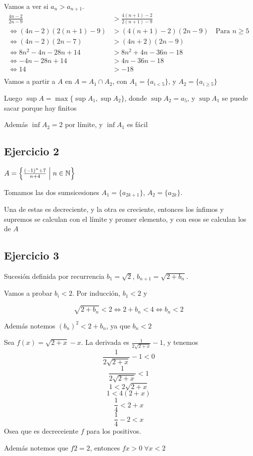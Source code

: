 \documentclass{article}
\begin{document}
	Vamos a ver si $a_n > a_{n+1}$.
\begin{align*}
	\frac{4n-2}{2n-9} &> \frac{4(n+1)-2}{2(n+1)-9} \\
	\iff (4n-2)(2(n+1)-9) &> (4(n+1)-2)(2n-9) \quad \text{Para $n \geq 5$}\\
	\iff (4n-2)(2n-7) &> (4n+2)(2n-9) \\
	\iff 8n^2-4n-28n+14 &> 8n^2+4n-36n-18 \\
	\iff -4n-28n+14 &> 4n-36n-18 \\
	\iff 14 &> -18 \\
\end{align*}
Vamos a partir a $A$ en $A = A_1 \cap A_2$, con $A_1 = \{a_{i < 5}\}$, y $A_2 = \{a_{i\geq 5}\}$

Luego $\sup A = \max \{\sup A_1, \sup A_2\}$, donde $\sup A_2 = a_5$, y $\sup A_1$ se
puede sacar porque hay finitos

Además $\inf A_2 = 2$ por límite, y $\inf A_1$ es fácil

\subsection{Ejercicio 2}
$A = \left\{\frac{(-1)^n + 7}{n+4} \; \middle| \; n \in \mathbb{N}\right\}$

Tomamos las dos sumsicesiones $A_1 = \{a_{2k+1}\}$, $A_2 = \{a_{2k}\}$.

Una de estas es decreciente, y la otra es creciente, entonces los ínfimos y supremos se
calculan con el límite y promer elemento, y con esos se calculan los de $A$

\subsection{Ejercicio 3}
Sucesión definida por recurrencia
$b_1 = \sqrt{2}$, $b_{n+1} = \sqrt{2 + b_n}$.

Vamos a probar $b_i < 2$. Por inducción,
$b_1 < 2$ y

\[\sqrt{2 + b_n} < 2 \iff 2 + b_n < 4\iff b_n < 2\]

Además notemos $(b_n)^2 < 2 + b_n$, ya que $b_n < 2$

Sea $f(x) = \sqrt{2 + x} - x$. La derivada es $\frac{1}{2\sqrt{2 + x}} - 1$, y tenemos
\[\frac{1}{2\sqrt{2 + x}} - 1 < 0\]
\[\frac{1}{2\sqrt{2 + x}} < 1\]
\[1 < 2\sqrt{2 + x}\]
\[1 < 4(2 + x)\]
\[\frac{1}{4} < 2 + x\]
\[\frac{1}{4} -2 < x\]
Osea que es decreceiente $f$ para los positivos.

Además notemos que $f 2 = 2$, entonces $f x > 0 \;\forall x < 2$
\end{document}
